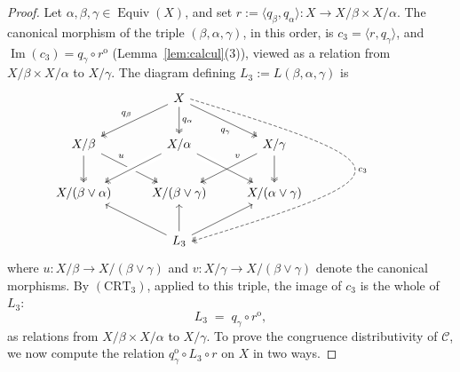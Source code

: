 \documentclass[11pt,a4paper]{article}
\theoremstyle{plain}
\theoremstyle{definition}
\theoremstyle{remark}
\theoremstyle{plain}
\newcommand{\Equiv}{\operatorname{Equiv}}
\newcommand{\im}{\operatorname{Im}}
\newcommand{\op}{\mathrm{o}}
\begin{document}
\begin{proof}
Let $\alpha, \beta, \gamma \in \Equiv(X)$, and set
$r := \langle q_\beta, q_\alpha\rangle \colon X \to X/\beta \times
X/\alpha$. The canonical morphism of the triple $(\beta, \alpha, \gamma)$,
in this order, is $c_3 = \langle r, q_\gamma\rangle$, and $\im (c_3) = q_\gamma \circ r^{\op}$
(Lemma~\ref{lem:calcul}(3)), viewed as a relation from
$X/\beta \times X/\alpha$ to $X/\gamma$. The diagram defining
$L_3 := L(\beta,\alpha,\gamma)$ is
\[
\begin{tikzcd}[column sep=1.2em, row sep=2.2em]
& & X
\arrow[dll, two heads, "q_\beta"']
\arrow[d, two heads, "q_\alpha"]
\arrow[drr, two heads, "q_\gamma"'{pos=0.65}]
\arrow[ddd, dashed, two heads, "c_3",
to path={(\tikztostart.east) .. controls +(6.2,-1.9) and +(6.2,1.9) ..
(\tikztotarget.east)\tikztonodes}] & & \\
X/\beta
\arrow[d, two heads]
\arrow[drr, two heads, "u"{pos=0.25}] & &
X/\alpha
\arrow[dll, two heads, crossing over]
\arrow[drr, two heads, crossing over] & &
X/\gamma
\arrow[dll, two heads, "v"'{pos=0.25}]
\arrow[d, two heads] \\
X/(\beta \vee \alpha) & &
X/(\beta \vee \gamma) & &
X/(\alpha \vee \gamma) \\
& & L_3
\arrow[ull]
\arrow[u]
\arrow[urr] & &
\end{tikzcd}
\]
where $u \colon X/\beta \to X/(\beta\vee\gamma)$ and
$v \colon X/\gamma \to X/(\beta\vee\gamma)$ denote the canonical
morphisms. By $(\mathrm{CRT}_3)$, applied to
this triple, the image of $c_3$ is the whole of $L_3$:
\[
L_3 \;=\; q_\gamma \circ r^{\op},
\]
as relations from $X/\beta \times X/\alpha$ to $X/\gamma$. To prove the congruence distributivity of $\mathcal C$, we now compute
the relation $q_\gamma^{\op} \circ L_3 \circ r$ on $X$ in two ways.


\end{proof}
\end{document}

